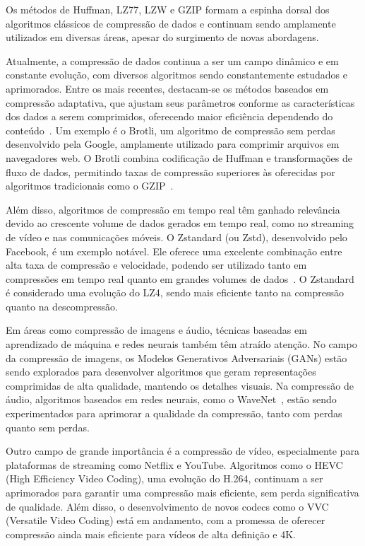 Os métodos de Huffman, LZ77, LZW e GZIP formam a espinha dorsal dos algoritmos clássicos de compressão de dados e continuam sendo amplamente utilizados em diversas áreas, apesar do surgimento de novas abordagens.  

Atualmente, a compressão de dados continua a ser um campo dinâmico e em constante evolução, com diversos algoritmos sendo constantemente estudados e aprimorados. Entre os mais recentes, destacam-se os métodos baseados em compressão adaptativa, que ajustam seus parâmetros conforme as características dos dados a serem comprimidos, oferecendo maior eficiência dependendo do conteúdo~\cite{salomon2007data}. Um exemplo é o Brotli, um algoritmo de compressão sem perdas desenvolvido pela Google, amplamente utilizado para comprimir arquivos em navegadores web. O Brotli combina codificação de Huffman e transformações de fluxo de dados, permitindo taxas de compressão superiores às oferecidas por algoritmos tradicionais como o GZIP~\cite{alakuijala2016brotli}.  

Além disso, algoritmos de compressão em tempo real têm ganhado relevância devido ao crescente volume de dados gerados em tempo real, como no streaming de vídeo e nas comunicações móveis. O Zstandard (ou Zstd), desenvolvido pelo Facebook, é um exemplo notável. Ele oferece uma excelente combinação entre alta taxa de compressão e velocidade, podendo ser utilizado tanto em compressões em tempo real quanto em grandes volumes de dados~\cite{collet2016zstandard}. O Zstandard é considerado uma evolução do LZ4, sendo mais eficiente tanto na compressão quanto na descompressão.  

Em áreas como compressão de imagens e áudio, técnicas baseadas em aprendizado de máquina e redes neurais também têm
atraído atenção. No campo da compressão de imagens, os Modelos Generativos Adversariais (GANs) estão sendo explorados
para desenvolver algoritmos que geram representações comprimidas de alta qualidade, mantendo os detalhes visuais. Na
compressão de áudio, algoritmos baseados em redes neurais, como o WaveNet~\cite{wavenet}, estão sendo experimentados para aprimorar a qualidade da compressão, tanto com perdas quanto sem perdas.  

Outro campo de grande importância é a compressão de vídeo, especialmente para plataformas de streaming como Netflix e YouTube. Algoritmos como o HEVC (High Efficiency Video Coding), uma evolução do H.264, continuam a ser aprimorados para garantir uma compressão mais eficiente, sem perda significativa de qualidade. Além disso, o desenvolvimento de novos codecs como o VVC (Versatile Video Coding) está em andamento, com a promessa de oferecer compressão ainda mais eficiente para vídeos de alta definição e 4K.  

